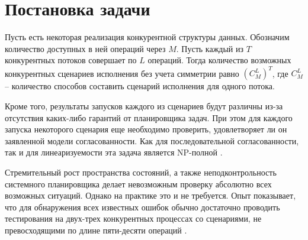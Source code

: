 \documentclass[14pt, openany]{book}
\begin{document}
\section{Постановка задачи}
Пусть есть некоторая реализация конкурентной структуры данных. Обозначим количество доступных в ней операций через \(M\). Пусть каждый из \(T\) конкурентных потоков совершает по \(L\) операций. Тогда количество возможных конкурентных сценариев исполнения без учета симметрии равно
\((C_M^L)^T\), где \(C_M^L\) -- количество способов составить сценарий исполнения для одного потока. \par
Кроме того, результаты запусков каждого из сценариев будут различны из-за отсутствия каких-либо гарантий от планировщика задач. При этом для каждого запуска некоторого сценария еще необходимо проверить, удовлетворяет ли он заявленной модели согласованности. Как для последовательной согласованности, так и для линеаризуемости эта задача является NP-полной \cite{complexity}. \par
Стремительный рост пространства состояний, а также неподконтрольность системного планировщика делает невозможным проверку абсолютно всех возможных ситуаций. Однако на практике это и не требуется. Опыт показывает, что для обнаружения всех известных ошибок обычно достаточно проводить тестирования на двух-трех конкурентных процессах со сценариями, не превосходящими по длине пяти-десяти операций \cite{lineup}.
\end{document}
